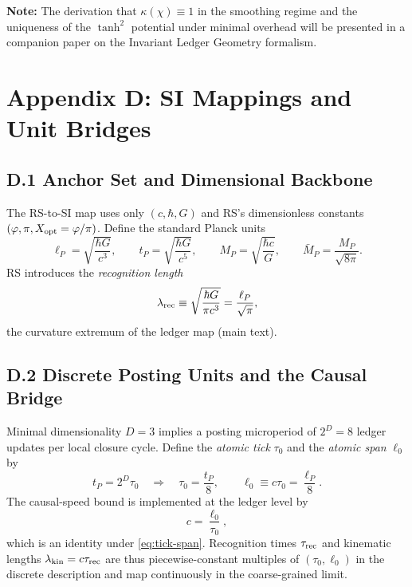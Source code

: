 \documentclass[11pt]{article}
\theoremstyle{definition}
\theoremstyle{remark}
\begin{document}
\medskip
\noindent\textbf{Note:} The derivation that \(\kappa(\chi)\equiv 1\) in the smoothing regime and the uniqueness of the \(\tanh^2\) potential under minimal overhead will be presented in a companion paper on the Invariant Ledger Geometry formalism.

\bigskip

\section*{Appendix D: SI Mappings and Unit Bridges}

\subsection*{D.1 Anchor Set and Dimensional Backbone}
The RS-to-SI map uses only $(c,\hbar,G)$ and RS's dimensionless constants $(\varphi,\pi,X_{\rm opt}=\varphi/\pi)$. Define the standard Planck units
\begin{equation}
\ell_P=\sqrt{\frac{\hbar G}{c^3}},\qquad
t_P=\sqrt{\frac{\hbar G}{c^5}},\qquad
M_P=\sqrt{\frac{\hbar c}{G}},\qquad
\bar{M}_P=\frac{M_P}{\sqrt{8\pi}}.
\label{eq:planck-set}
\end{equation}
RS introduces the \emph{recognition length}
\begin{equation}
\lambda_{\rm rec} \equiv \sqrt{\frac{\hbar G}{\pi c^3}}=\frac{\ell_P}{\sqrt{\pi}},
\label{eq:lambda-rec}
\end{equation}
the curvature extremum of the ledger map (main text).

\subsection*{D.2 Discrete Posting Units and the Causal Bridge}
Minimal dimensionality $D=3$ implies a posting microperiod of $2^D=8$ ledger updates per local closure cycle. Define the \emph{atomic tick} $\tau_0$ and the \emph{atomic span} $\ell_0$ by
\begin{equation}
t_P = 2^D\tau_0 \quad\Longrightarrow\quad \tau_0=\frac{t_P}{8},\qquad
\ell_0 \equiv c\tau_0=\frac{\ell_P}{8}.
\label{eq:tick-span}
\end{equation}
The causal-speed bound is implemented at the ledger level by
\begin{equation}
c=\frac{\ell_0}{\tau_0},
\label{eq:c-bridge}
\end{equation}
which is an identity under \eqref{eq:tick-span}. Recognition times $\tau_{\rm rec}$ and kinematic lengths $\lambda_{\rm kin}=c\tau_{\rm rec}$ are thus piecewise-constant multiples of $(\tau_0,\ell_0)$ in the discrete description and map continuously in the coarse-grained limit.
\end{document}
